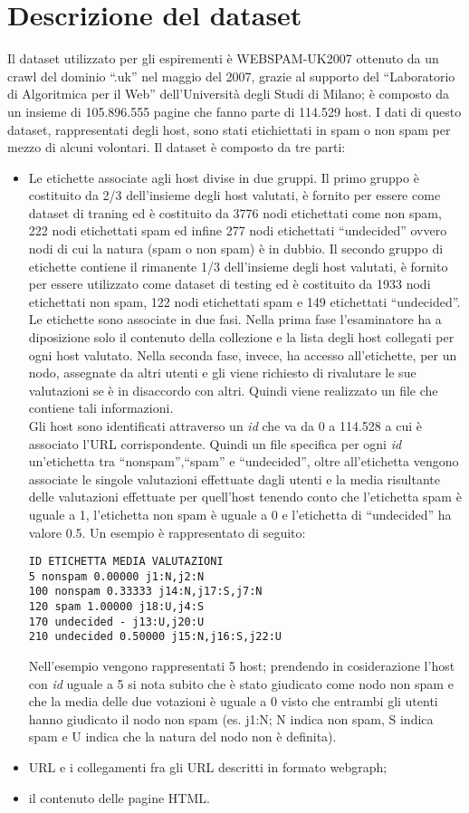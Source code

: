 \section{Descrizione del dataset}
Il dataset utilizzato per gli espirementi è WEBSPAM-UK2007 \cite{webspam-uk2007} ottenuto da un crawl del dominio ``.uk'' nel maggio del 2007, grazie al supporto del ``Laboratorio di Algoritmica per il Web'' dell'Università degli Studi di Milano; è composto da un insieme di 105.896.555 pagine che fanno parte di 114.529 host. I dati di questo dataset, rappresentati degli host, sono stati etichiettati in spam o non spam per mezzo di alcuni volontari. Il dataset è composto da tre parti:
\begin{itemize}
 \item Le etichette associate agli host divise in due gruppi. Il primo gruppo è costituito da 2/3 dell'insieme degli host valutati, è fornito per essere come dataset di traning ed è costituito da 3776 nodi etichettati come non spam, 222 nodi etichettati spam ed infine 277 nodi etichettati ``undecided'' ovvero nodi di cui la natura (spam o non spam) è in dubbio. Il secondo gruppo di etichette contiene il rimanente 1/3 dell'insieme degli host valutati, è fornito per essere utilizzato come dataset di testing ed è costituito da 1933 nodi etichettati non spam, 122 nodi etichettati spam e 149 etichettati ``undecided''.\\
 Le etichette sono associate in due fasi. Nella prima fase l'esaminatore ha a diposizione solo il contenuto della collezione e la lista degli host collegati per ogni host valutato. Nella seconda fase, invece, ha accesso all'etichette, per un nodo, assegnate da altri utenti e gli viene richiesto di rivalutare le sue valutazioni se è in disaccordo con altri. Quindi viene realizzato un file che contiene tali informazioni.\\ 
 Gli host sono identificati attraverso un \textit{id} che va da 0 a 114.528 a cui è associato l'URL corrispondente. Quindi un file specifica per ogni \textit{id} un'etichetta tra ``nonspam'',``spam'' e ``undecided'', oltre all'etichetta vengono associate le singole valutazioni effettuate dagli utenti e la media risultante delle valutazioni effettuate per quell'host tenendo conto che l'etichetta spam è uguale a 1, l'etichetta non spam è uguale a 0 e l'etichetta di ``undecided'' ha valore 0.5. Un esempio è rappresentato di seguito: 
 \begin{lstlisting}[frame=trbl,postbreak=\space, breakindent=5pt, breaklines]
ID ETICHETTA MEDIA VALUTAZIONI
5 nonspam 0.00000 j1:N,j2:N
100 nonspam 0.33333 j14:N,j17:S,j7:N
120 spam 1.00000 j18:U,j4:S
170 undecided - j13:U,j20:U
210 undecided 0.50000 j15:N,j16:S,j22:U
\end{lstlisting}
Nell'esempio vengono rappresentati 5 host; prendendo in cosiderazione l'host con \textit{id} uguale a 5 si nota subito che è stato giudicato come nodo non spam e che la media delle due votazioni è uguale a 0 visto che entrambi gli utenti hanno giudicato il nodo non spam (es. j1:N; N indica non spam, S indica spam e U indica che la natura del nodo non è definita).
 
 \item URL e i collegamenti fra gli URL descritti in formato webgraph;
 
 \item il contenuto delle pagine HTML.
\end{itemize}

